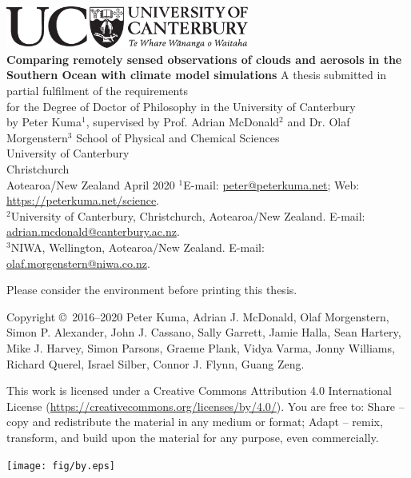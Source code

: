 \thispagestyle{empty}
\begin{center}
\centering
\includegraphics[width=0.6\textwidth]{fig/UCBlack_LAN_Te_Reo.pdf}\\
\vfill
\huge
\sffamily
\textbf{Comparing remotely sensed observations of clouds and
aerosols in the Southern Ocean with climate model
simulations}
\normalfont
\vfill
\Large
A thesis submitted in partial fulfilment of the requirements\\
for the Degree of Doctor of Philosophy
in the University of Canterbury\\
by Peter Kuma$^1$,
\vfill
supervised by Prof. Adrian McDonald$^2$ and Dr. Olaf Morgenstern$^3$
\vfill
School of Physical and Chemical Sciences\\
University of Canterbury\\
Christchurch\\
Aotearoa/New Zealand
\vfill
April 2020
\vfill
\footnotesize
$^1$E-mail: \href{mailto:peter@peterkuma.net}{peter@peterkuma.net}; Web: \href{https://peterkuma.net/science}{https://peterkuma.net/science}.\\
$^2$University of Canterbury, Christchurch, Aotearoa/New Zealand. E-mail:
\href{mailto:adrian.mcdonald@canterbury.ac.nz}{adrian.mcdonald@canterbury.ac.nz}.\\
$^3$NIWA, Wellington, Aotearoa/New Zealand. E-mail: \href{olaf.morgenstern@niwa.co.nz}{olaf.morgenstern@niwa.co.nz}.
\end{center}
\clearpage
\thispagestyle{empty}
\normalfont
\null
\vfill
\noindent
\begin{center}
\Large
\noindent
Please consider the environment before printing this thesis.
\end{center}
\vfill
\noindent
Copyright \copyright\ 2016--2020 Peter Kuma,
Adrian J. McDonald, Olaf Morgenstern, Simon P. Alexander, John J. Cassano,
Sally Garrett, Jamie Halla, Sean Hartery, Mike J. Harvey, Simon Parsons,
Graeme Plank, Vidya Varma, Jonny Williams, Richard Querel, Israel Silber, Connor J. Flynn,
Guang Zeng.\\
\par
\noindent
This work is licensed under a Creative Commons Attribution 4.0 International License (\url{https://creativecommons.org/licenses/by/4.0/}). You are free to: Share -- copy and redistribute the material in any medium or format;  Adapt -- remix, transform, and build upon the material for any purpose, even commercially.
\vspace{0.5cm}
\par
\begin{center}
\texttt{[image: fig/by.eps]}
\end{center}
\clearpage
